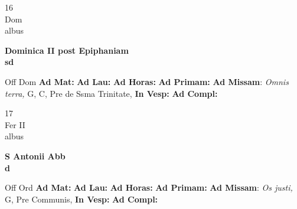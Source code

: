 \documentclass[10pt, openany]{book}
\begin{document}
    \begin{center}
        \begin{minipage}{3.5in}
            \vspace{2em}
            \begin{minipage}{0.5in}
                {\Huge 16} \\
                {\normalsize Dom} \\
                {\normalsize albus}
            \end{minipage}
            \begin{minipage}{3.0in}
                \textbf{ \large Dominica II post Epiphaniam \\
                \textnormal{\normalsize sd}} \\ 
            \end{minipage}
            \begin{justify}Off Dom
                \textbf{Ad Mat: }
                \textbf{Ad Lau: }
                \textbf{Ad Horas: }
                \textbf{Ad Primam: }\textbf{Ad Missam}: \textit{Omnis terra,} G, C, Pre de Ssma Trinitate,  
                \textbf{In Vesp: }
                \textbf{Ad Compl: }
            \end{justify}
        \end{minipage}
    \end{center}

    \begin{center}
        \begin{minipage}{3.5in}
            \vspace{2em}
            \begin{minipage}{0.5in}
                {\Huge 17} \\
                {\normalsize Fer II} \\
                {\normalsize albus}
            \end{minipage}
            \begin{minipage}{3.0in}
                \textbf{ \large S Antonii Abb \\
                \textnormal{\normalsize d}} \\ 
            \end{minipage}
            \begin{justify}Off Ord
                \textbf{Ad Mat: }
                \textbf{Ad Lau: }
                \textbf{Ad Horas: }
                \textbf{Ad Primam: }\textbf{Ad Missam}: \textit{Os justi,} G, Pre Communis,  
                \textbf{In Vesp: }
                \textbf{Ad Compl: }
            \end{justify}
        \end{minipage}
    \end{center}
\end{document}
